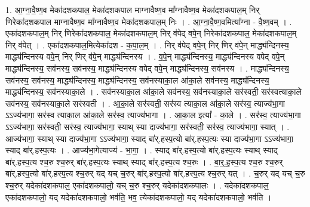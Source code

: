 \documentclass[17pt]{extarticle}
\begin{document}
1. आ॒ग्ना॒वै॒ष्ण॒व मेका॑दशकपाल॒ मेका॑दशकपाल माग्नावैष्ण॒व मा᳚ग्नावैष्ण॒व मेका॑दशकपाल॒म् निर् णिरेका॑दशकपाल माग्नावैष्ण॒व मा᳚ग्नावैष्ण॒व मेका॑दशकपाल॒म् निः । . आ॒ग्ना॒वै॒ष्ण॒वमित्या᳚ग्ना - वै॒ष्ण॒वम् । . एका॑दशकपाल॒म् निर् णिरेका॑दशकपाल॒ मेका॑दशकपाल॒म् निर् व॑पेद् वपे॒न् निरेका॑दशकपाल॒ मेका॑दशकपाल॒म् निर् व॑पेत् । . एका॑दशकपाल॒मित्येका॑दश - क॒पा॒ल॒म् । . निर् व॑पेद् वपे॒न् निर् णिर् व॑पे॒न् माद्ध्य॑न्दिनस्य॒ माद्ध्य॑न्दिनस्य वपे॒न् निर् णिर् व॑पे॒न् माद्ध्य॑न्दिनस्य । . व॒पे॒न् माद्ध्य॑न्दिनस्य॒ माद्ध्य॑न्दिनस्य वपेद् वपे॒न् माद्ध्य॑न्दिनस्य॒ सव॑नस्य॒ सव॑नस्य॒ माद्ध्य॑न्दिनस्य वपेद् वपे॒न् माद्ध्य॑न्दिनस्य॒ सव॑नस्य । . माद्ध्य॑न्दिनस्य॒ सव॑नस्य॒ सव॑नस्य॒ माद्ध्य॑न्दिनस्य॒ माद्ध्य॑न्दिनस्य॒ सव॑नस्याका॒ल आ॑का॒ले सव॑नस्य॒ माद्ध्य॑न्दिनस्य॒ माद्ध्य॑न्दिनस्य॒ सव॑नस्याका॒ले । . सव॑नस्याका॒ल आ॑का॒ले सव॑नस्य॒ सव॑नस्याका॒ले सर॑स्वती॒ सर॑स्वत्याका॒ले सव॑नस्य॒ सव॑नस्याका॒ले सर॑स्वती । . आ॒का॒ले सर॑स्वती॒ सर॑स्व त्याका॒ल आ॑का॒ले सर॑स्व॒ त्याज्य॑भा॒गा ऽऽज्य॑भागा॒ सर॑स्व त्याका॒ल आ॑का॒ले सर॑स्व॒ त्याज्य॑भागा । . आ॒का॒ल इत्या᳚ - का॒ले । . सर॑स्व॒ त्याज्य॑भा॒गा ऽऽज्य॑भागा॒ सर॑स्वती॒ सर॑स्व॒ त्याज्य॑भागा॒ स्याथ् स्या दाज्य॑भागा॒ सर॑स्वती॒ सर॑स्व॒ त्याज्य॑भागा॒ स्यात् । . आज्य॑भागा॒ स्याथ् स्या दाज्य॑भा॒गा ऽऽज्य॑भागा॒ स्याद् बा॑र्.हस्प॒त्यो बा॑र्.हस्प॒त्यः स्या दाज्य॑भा॒गा ऽऽज्य॑भागा॒ स्याद् बा॑र्.हस्प॒त्यः । . आज्य॑भा॒गेत्याज्य॑ - भा॒गा॒ । . स्याद् बा॑र्.हस्प॒त्यो बा॑र्.हस्प॒त्यः स्याथ् स्याद् बा॑र्.हस्प॒त्य श्च॒रु श्च॒रुर् बा॑र्.हस्प॒त्यः स्याथ् स्याद् बा॑र्.हस्प॒त्य श्च॒रुः । . बा॒र्॒.ह॒स्प॒त्य श्च॒रु श्च॒रुर् बा॑र्.हस्प॒त्यो बा॑र्.हस्प॒त्य श्च॒रुर् यद् यच् च॒रुर् बा॑र्.हस्प॒त्यो बा॑र्.हस्प॒त्य श्च॒रुर् यत् । . च॒रुर् यद् यच् च॒रु श्च॒रुर् यदेका॑दशकपाल॒ एका॑दशकपालो॒ यच् च॒रु श्च॒रुर् यदेका॑दशकपालः । . यदेका॑दशकपाल॒ एका॑दशकपालो॒ यद् यदेका॑दशकपालो॒ भव॑ति॒ भव॒ त्येका॑दशकपालो॒ यद् यदेका॑दशकपालो॒ भव॑ति । \newline
\end{document}
